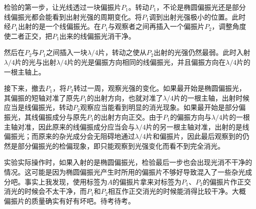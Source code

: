 \documentclass[UTF8]{ctexart}
\begin{document}
检验的第一步，让光线透过一块偏振片$P_1$。转动$P_1$，不论是椭圆偏振光还是部分线偏振光都会能看到出射光强的周期变化。将$P_1$调到出射光强极小的位置。此时经$P_1$出射的是一个线偏振光。在$P_1$与观察者之间再插入一个偏振片$P_2$，调整角度使二者正交，把$P_1$出来的线偏振光消干净。

然后在$P_2$与$P_1$之间插入一块$\lambda/4$片，转动之使从$P_2$出射的光强仍然最弱。此时入射$\lambda/4$片的光与出射$\lambda/4$片的光是偏振方向相同的线偏振光，并且偏振方向在$\lambda/4$片的一根主轴上。

接下来，撤去$P_1$，将$P_2$转过一周，观察光强的变化。如果最开始是椭圆偏振光，其偏振的短轴对准了原先$P_1$的出射方向，也就对准了$\lambda/4$片的一根主轴，出射时候应当是线偏振光，转动$P_2$观察应当能看到明显的消光现象。如果最开始是部分偏振光，其线偏振成分与原先$P_1$的出射方向正交。由于$P_1$的偏振方向与$\lambda/4$片的一根主轴对准，因此原来的线偏振成分应当会与$\lambda/4$片的另一根主轴对准，出射的是线偏振光；而原来的杂光成分会无阻碍地通过$\lambda/4$片和偏振片，因此最后观察到的仍然是部分偏振光的检偏现象，即只能观察到光强变化而看不到完全消光。

实验实际操作时，如果入射的是椭圆偏振光，检验最后一步也会出现光消不干净的情况。这可能是因为椭圆偏振光产生时所用的偏振片不够好导致混入了一些杂光成分吧。事实上我发现，使用标签为$A$的偏振片拿来对标签为$P_1$、$P_2$的偏振片作正交消光的时候会不太干净，而$P_1$和$P_2$相互作正交消光的时候能消得比较干净。大概偏振片的质量确实有好有坏吧。待考待考。
\end{document}
